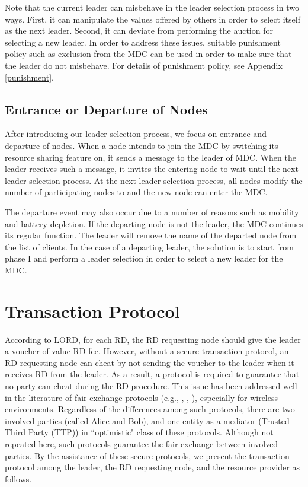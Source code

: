\documentclass[journal,12pt, onecolumn]{IEEEtran}
\begin{document}
Note that the current leader can misbehave in the leader selection process in two ways. First, it can manipulate the values offered by others in order to select itself as the next leader. Second, it can deviate from performing the auction for selecting a new leader. In order to address these issues, suitable punishment policy such as exclusion from the MDC can be used in order to make sure that the leader do not misbehave. For details of punishment policy, see Appendix \ref{punishment}.







 





\subsection{Entrance or Departure of Nodes}\label{section:entrance}
After introducing our leader selection process, we focus on entrance and departure of nodes. When a node intends to join the MDC by switching its resource sharing feature on, it sends a message to the leader of MDC. When the leader receives such a message, it invites the entering node to wait until the next leader selection process. At the next leader selection process, all nodes modify the number of participating nodes to  and the new node can enter the MDC.


The departure event may also occur due to a number of reasons such as mobility and battery depletion. If the departing node is not the leader, the MDC continues its regular function. The leader will remove the name of the departed node from the list of clients. 
In the case of a departing leader, the solution is to start from phase I and perform a leader selection in order to select a new leader for the MDC. 



\section{Transaction Protocol}
\label{trans_protocol}

According to LORD, for each RD, the RD requesting node should give the leader a voucher of value RD fee. However, without a secure transaction protocol, an RD requesting node can cheat by not sending the voucher to the leader when it receives RD from the leader. As a result, a protocol is required to guarantee that no party can cheat during the RD procedure. This issue has been addressed well in the literature of fair-exchange protocols (e.g., \cite{x500}, \cite{x502}, \cite{x25}), especially for wireless environments. Regardless of the differences among such protocols, there are two involved parties (called Alice and Bob), and one entity as a mediator (Trusted Third Party (TTP)) in ``optimistic" class of these protocols. Although not repeated here, such protocols guarantee the fair exchange between involved parties. By the assistance of these secure protocols, we present the transaction protocol among the leader, the RD requesting node, and the resource provider as follows.
\end{document}
